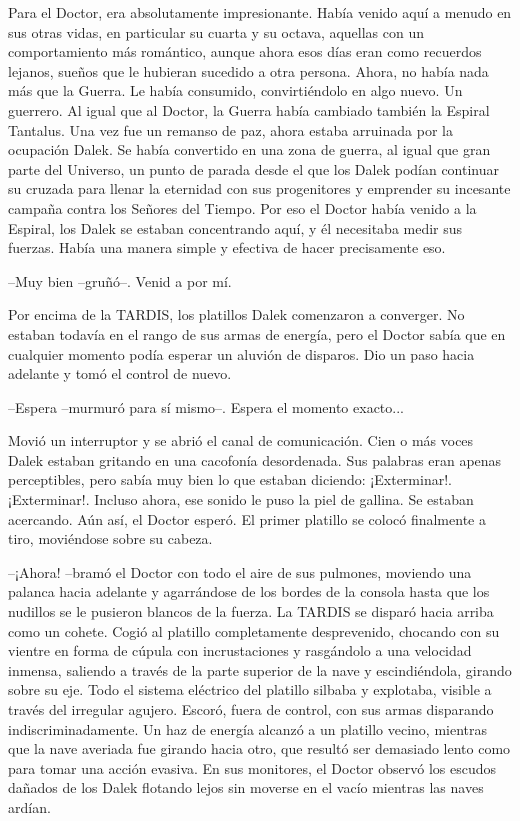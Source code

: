 Para el Doctor, era absolutamente impresionante. Había venido aquí a menudo en sus otras vidas, en particular su cuarta y su octava, aquellas con un comportamiento más romántico,  aunque ahora esos días eran como recuerdos lejanos, sueños que le hubieran sucedido a otra persona. Ahora, no había nada más que la Guerra. Le había consumido, convirtiéndolo en algo nuevo. Un guerrero.
Al igual que al Doctor, la Guerra había cambiado también la Espiral Tantalus. Una vez fue un remanso de paz, ahora estaba arruinada por la ocupación Dalek. Se había convertido en una zona de guerra, al igual que gran parte del Universo, un punto de parada desde el que los Dalek podían continuar su cruzada para llenar la eternidad con sus progenitores y emprender su incesante campaña contra los Señores del Tiempo. Por eso el Doctor había venido a la Espiral, los Dalek se estaban concentrando aquí, y él necesitaba medir sus fuerzas. Había una manera simple y efectiva de hacer precisamente eso.

--Muy bien --gruñó--. Venid a por mí.

Por encima de la TARDIS, los platillos Dalek comenzaron a converger. No estaban todavía en el rango de sus armas de energía, pero el Doctor sabía que en cualquier momento podía esperar un aluvión de disparos. Dio un paso hacia adelante y tomó el control de nuevo.

--Espera --murmuró para sí mismo--. Espera el momento exacto...

Movió un interruptor y se abrió el canal de comunicación. Cien o más voces Dalek estaban gritando en una cacofonía desordenada. Sus palabras eran apenas perceptibles, pero sabía muy bien lo que estaban diciendo: ¡Exterminar!. ¡Exterminar!. Incluso ahora, ese sonido le puso la piel de gallina.
Se estaban acercando. Aún así, el Doctor esperó. El primer platillo se colocó finalmente a tiro, moviéndose sobre su cabeza.

--¡Ahora! --bramó el Doctor con todo el aire de sus pulmones, moviendo una palanca hacia adelante y agarrándose de los bordes de la consola hasta que los nudillos se le pusieron blancos de la fuerza.
La TARDIS se disparó hacia arriba como un cohete. Cogió al platillo completamente desprevenido, chocando con su vientre en forma de cúpula con incrustaciones y rasgándolo a una velocidad inmensa, saliendo a través de la parte superior de la nave y escindiéndola, girando sobre su eje.
Todo el sistema eléctrico del platillo silbaba y explotaba, visible a través del irregular agujero. Escoró, fuera de control, con sus armas disparando indiscriminadamente. Un haz de energía alcanzó a un platillo vecino, mientras que la nave averiada fue girando hacia otro, que resultó ser demasiado lento como para tomar una acción evasiva.
En sus monitores, el Doctor observó los escudos dañados de los Dalek flotando lejos sin moverse en el vacío mientras las naves ardían.

